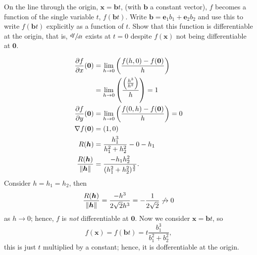On the line through the origin, $\bm x = \bm b t$, (with $\bm b$ a constant vector), $f$ becomes a function of the single variable $t$, $f(\bm bt)$. 
Write $\bm b = \bm e_1 b_1 + \bm e_2 b_2$ and use this to write $f(\bm bt)$ explicitly as a function of $t$. 
Show that this function is differentiable at the origin, that is, $\sfrac{df}{dt}$ exists at $t = 0$ despite $f(\bm x)$ not being differentiable at $\bm 0$.

\begin{solution}
    \begin{align*}
        \frac{\partial f}{\partial x} (\bm 0) &= \lim_{h \to 0} \left(\frac{f(h, 0) - f(\bm 0)}{h}\right) \\
        &= \lim_{h \to 0} \left(\frac{\left(\frac{h^3}{h^2}\right)}{h}\right) = 1 \\
        \frac{\partial f}{\partial y} (\bm 0) &= \lim_{h \to 0} \left(\frac{f(0, h) - f(\bm 0)}{h}\right) = 0 \\
        \nabla f(\bm 0) &= (1, 0) \\
        R(\bm h) &= \frac{h_1^3}{h_1^2 + h_2^2} - 0 - h_1 \\
        \frac{R(\bm h)}{\left\lVert\bm h\right\rVert} &= \frac{-h_1h_2^2}{(h_1^2 + h_2^2)^{\frac32}}.
    \end{align*}
    Consider $h = h_1 = h_2$, then 
    \[ \frac{R(\bm h)}{\left\lVert\bm h\right\rVert} = \frac{-h^3}{2\sqrt 2 h^3} = -\frac1{2\sqrt 2} \not \to 0 \]
    as $h \to 0$; hence, $f$ is \emph{not} differentiable at $\bm 0$.
    Now we consider $\bm x = \bm bt$, so
    \[ f(\bm x) = f(\bm bt) = t\frac{b_1^3}{b_1^2 + b_2^2}, \]
    this is just $t$ multiplied by a constant; hence, it is dofferentiable at the origin. 
\end{solution}
